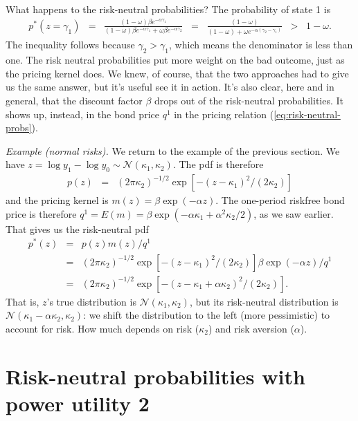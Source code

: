 \documentclass[11pt]{article}
\begin{document}
What happens to the risk-neutral probabilities?
The probability of state 1 is
\begin{eqnarray*}
        p^*(z=\gamma_1)
            &=& \frac{(1-\omega) \beta e^{-\alpha \gamma_1}}
                    {(1-\omega) \beta e^{-\alpha \gamma_1} + \omega \beta e^{-\alpha \gamma_2}}
            \;\;=\;\; \frac{(1-\omega)}
                    {(1-\omega) + \omega e^{-\alpha (\gamma_2-\gamma_1)}}
            \;\;>\;\; 1-\omega .
\end{eqnarray*}
The inequality follows because $\gamma_2 > \gamma_1$,
which means the denominator is less than one.
The risk neutral probabilities put more weight
on the bad outcome, just as the pricing kernel does.
We knew, of course, that the two approaches had to give us the same answer,
but it's useful see it in action.
It's also clear, here and in general, that the discount factor $\beta$
drops out of the risk-neutral probabilities.
It shows up, instead, in the bond price $q^1$ in the pricing relation
(\ref{eq:risk-neutral-probs}).

{\it Example (normal risks).\/}
We return to the example of the previous section.
We have $ z = \log y_1 - \log y_0 \sim \mathcal{N}(\kappa_1, \kappa_2) $.
The pdf is therefore
\begin{eqnarray*}
    p(z) &=& (2 \pi \kappa_2)^{-1/2} \exp[ - (z-\kappa_1)^2/(2\kappa_2)]
\end{eqnarray*}
and the pricing kernel is $m(z) = \beta \exp(-\alpha z)$.
The one-period riskfree bond price is therefore
$ q^1 = E(m) = \beta \exp(-\alpha \kappa_1 + \alpha^2 \kappa_2/2)$,
as we saw earlier.
That gives us the risk-neutral pdf
\begin{eqnarray*}
    p^*(z)  &=& p(z) m (z) /q^1 \\
            &=& (2 \pi \kappa_2)^{-1/2} \exp[ - (z-\kappa_1)^2/(2\kappa_2)]
                        \beta \exp(-\alpha z)/q^1 \\
            &=& (2 \pi \kappa_2)^{-1/2} \exp[ - (z-\kappa_1+\alpha \kappa_2)^2/(2\kappa_2)] .
\end{eqnarray*}
That is, $z$'s true distribution is $\mathcal{N}(\kappa_1,\kappa_2)$,
but its risk-neutral distribution is $\mathcal{N}(\kappa_1-\alpha \kappa_2,\kappa_2)$:
we shift the distribution to the left (more pessimistic) to account
for risk.  How much depends on risk ($\kappa_2$) and risk aversion ($\alpha$).


\section{Risk-neutral probabilities with power utility 2}
\end{document}
